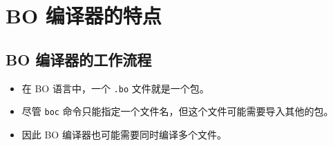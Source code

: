 \documentclass[dvipsnames, svgnames, x11names]{beamer}
\begin{document}
\section{BO 编译器的特点}

\subsection{BO 编译器的工作流程}
\begin{frame}
    \begin{itemize}[<+->]
        \item 在 BO 语言中，一个 \texttt{.bo} 文件就是一个包。
        \item 尽管 \texttt{boc} 命令只能指定一个文件名，但这个文件可能需要导入其他的包。
        \item 因此 BO 编译器也可能需要同时编译多个文件。
    \end{itemize}
\end{frame}
\end{document}
